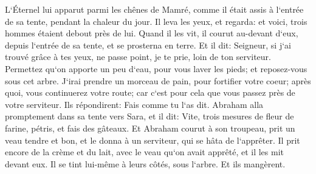 \verse L`Éternel lui apparut parmi les chênes de Mamré, comme il était assis à l`entrée de sa tente, pendant la chaleur du jour. 
\verse Il leva les yeux, et regarda: et voici, trois hommes étaient debout près de lui. Quand il les vit, il courut au-devant d`eux, depuis l`entrée de sa tente, et se prosterna en terre. 
\verse Et il dit: Seigneur, si j`ai trouvé grâce à tes yeux, ne passe point, je te prie, loin de ton serviteur. 
\verse Permettez qu`on apporte un peu d`eau, pour vous laver les pieds; et reposez-vous sous cet arbre. 
\verse J`irai prendre un morceau de pain, pour fortifier votre coeur; après quoi, vous continuerez votre route; car c`est pour cela que vous passez près de votre serviteur. Ils répondirent: Fais comme tu l`as dit. 
\verse Abraham alla promptement dans sa tente vers Sara, et il dit: Vite, trois mesures de fleur de farine, pétris, et fais des gâteaux. 
\verse Et Abraham courut à son troupeau, prit un veau tendre et bon, et le donna à un serviteur, qui se hâta de l`apprêter. 
\verse Il prit encore de la crème et du lait, avec le veau qu`on avait apprêté, et il les mit devant eux. Il se tint lui-même à leurs côtés, sous l`arbre. Et ils mangèrent. 
